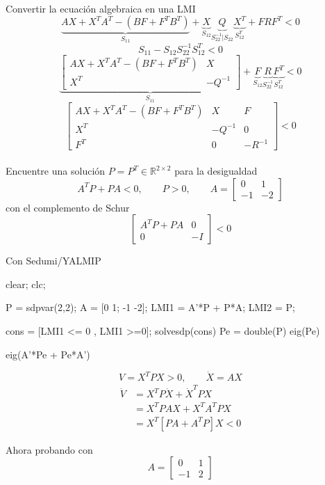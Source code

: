 \paragraph{}
Convertir la ecuación algebraica en una LMI
\[
  \underbrace{AX+X^{T}A^{T}-(BF+F^{T}B^{T})}_{S_{11}}
  +\underbrace{X}_{S_{12}}
  \underbrace{Q}_{S_{22}^{-1} | S_{22}}
  \underbrace{X^{T}}_{S_{12}^{T}}
  +FRF^{T}<0
\]
\[
  S_{11}-S_{12}S_{22}^{-1}S_{12}^{T}<0
\]
\[
  \underbrace{
    \begin{bmatrix}
      AX+X^{T}A^{T}-(BF+F^{T}B^{T}) & X\\
      X^{T} & -Q^{-1}
  \end{bmatrix}}_{S_{11}}
  +\underbrace{F}_{S_{12}}
  \underbrace{R}_{S_{22}^{-1}}
  \underbrace{F^{T}}_{S_{12}^{T}}<0
\]
\[
  \begin{bmatrix}
    AX+X^{T}A^{T}-(BF+F^{T}B^{T}) & X & F\\
    X^{T} & -Q^{-1} & 0\\
    F^{T} & 0 & -R^{-1}
  \end{bmatrix}<0
\]

\paragraph{}
Encuentre una solución $P=P^{T}\in\mathbb{R}^{2\times2}$ para la desigualdad
\[
  A^{T}P+PA<0,
  \qquad P>0,
  \qquad
  A=
  \begin{bmatrix}
    0 & 1\\
    -1 & -2
  \end{bmatrix}
\]
con el complemento de Schur
\[
  \begin{bmatrix}
    A^{T}P+PA & 0\\
    0 & -I
  \end{bmatrix}<0
\]

Con Sedumi/YALMIP
\begin{MatlabCode}
  clear; clc;

  P = sdpvar(2,2);
  A = [0 1; -1 -2];
  LMI1 = A'*P + P*A;
  LMI2 = P;

  cons = [LMI1 <= 0 , LMI1 >=0];
  solvesdp(cons)
  Pe = double(P)
  eig(Pe)

  eig(A'*Pe + Pe*A')
\end{MatlabCode}

\[
  V=X^{T}PX>0,
  \qquad \dot{X}=AX
\]
\begin{align*}
  \dot{V}
  &=X^{T}P\dot{X}+\dot{X}^{T}PX\\
  &=X^{T}PAX+X^{T}A^{T}PX\\
  &=X^{T}[PA+A^{T}P]X<0
\end{align*}

Ahora probando con
\[
  A=
  \begin{bmatrix}
    0 & 1\\
    -1 & 2
  \end{bmatrix}
\]
